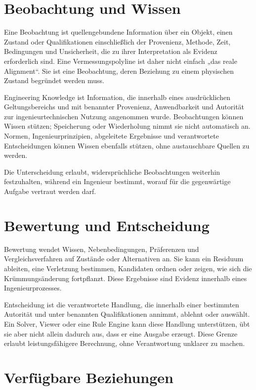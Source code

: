 \section{Beobachtung und Wissen}

Eine Beobachtung ist quellengebundene Information über ein Objekt, einen
Zustand oder Qualifikationen einschließlich der Provenienz, Methode, Zeit,
Bedingungen und Unsicherheit, die zu ihrer Interpretation als Evidenz
erforderlich sind. Eine Vermessungspolyline ist daher nicht einfach „das reale
Alignment“. Sie ist eine Beobachtung, deren Beziehung zu einem physischen
Zustand begründet werden muss.

Engineering Knowledge ist Information, die innerhalb eines ausdrücklichen
Geltungsbereichs und mit benannter Provenienz, Anwendbarkeit und Autorität zur
ingenieurtechnischen Nutzung angenommen wurde. Beobachtungen können Wissen
stützen; Speicherung oder Wiederholung nimmt sie nicht automatisch an. Normen,
Ingenieurprinzipien, abgeleitete Ergebnisse und verantwortete Entscheidungen
können Wissen ebenfalls stützen, ohne austauschbare Quellen zu werden.

Die Unterscheidung erlaubt, widersprüchliche Beobachtungen weiterhin
festzuhalten, während ein Ingenieur bestimmt, worauf für die gegenwärtige
Aufgabe vertraut werden darf.

\section{Bewertung und Entscheidung}

Bewertung wendet Wissen, Nebenbedingungen, Präferenzen und
Vergleichsverfahren auf Zustände oder Alternativen an. Sie kann ein Residuum
ableiten, eine Verletzung bestimmen, Kandidaten ordnen oder zeigen, wie sich
die Krümmungsänderung fortpflanzt. Diese Ergebnisse sind Evidenz innerhalb
eines Ingenieurprozesses.

Entscheidung ist die verantwortete Handlung, die innerhalb einer bestimmten
Autorität und unter benannten Qualifikationen annimmt, ablehnt oder auswählt.
Ein Solver, Viewer oder eine Rule Engine kann diese Handlung unterstützen,
übt sie aber nicht allein dadurch aus, dass er eine Ausgabe erzeugt. Diese
Grenze erlaubt leistungsfähigere Berechnung, ohne Verantwortung unklarer zu
machen.

\section{Verfügbare Beziehungen}

